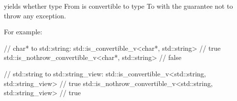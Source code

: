 




yields whether type From is convertible to type To with the guarantee not to throw any exception.

For example:

\begin{cpp}
// char* to std::string:
std::is_convertible_v<char*, std::string> // true
std::is_nothrow_convertible_v<char*, std::string> // false

// std::string to std::string_view:
std::is_convertible_v<std::string, std::string_view> // true
std::is_nothrow_convertible_v<std::string, std::string_view> // true
\end{cpp}







